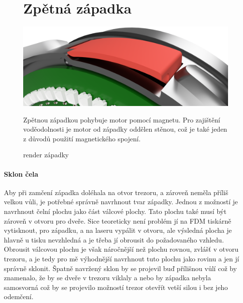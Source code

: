 \begin{figure}[zapadka]
    \section*{Zpětná západka}
    \centering
    \includegraphics[width=\textwidth]{kapitoly/obrazky/E4/zapadka/render.png}
    \caption{render západky}
    Zpětnou západkou pohybuje motor pomocí magnetu. Pro zajištění voděodolnosti je motor od západky oddělen stěnou, což je také jeden z důvodů 
    použití magnetického spojení.
    \label{fig:E4-zapadka}
\end{figure}

\clearpage
\newpage

\paragraph{Sklon čela}

Aby při zamčení západka doléhala na otvor trezoru, a zároveň neměla příliš velkou vůli, je potřebné správně navrhnout tvar západky.
Jednou z možností je navrhnout čelní plochu jako část válcové plochy. Tato plochu také musí být zároveň v otvoru pro dveře.
Sice teoreticky není problém jí na FDM tiskárně vytisknout, pro západku, a na laseru vypálit v otvoru, ale výsledná plocha je hlavně u tisku 
nevzhledná a je třeba jí obrousit do požadovaného vzhledu. Obrousit válcovou plochu je však náročnější než plochu rovnou, zvlášť v otvoru trezoru, 
a je tedy pro mě výhodnější navrhnout tuto plochu jako rovinu a jen jí správně sklonit. Špatně navržený sklon by se projevil buď přílišnou vůlí 
což by znamenalo, že by se dveře v trezoru viklaly a nebo by západka nebyla samosvorná což by se projevilo možností trezor otevřít vetší silou 
i bez jeho odemčení.

